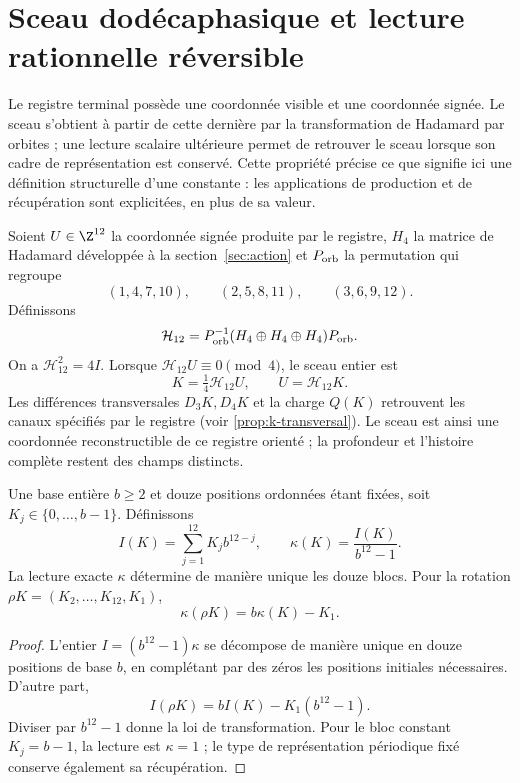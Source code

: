 \section{Sceau dodécaphasique et lecture rationnelle réversible}
\label{sec:sello}

Le registre terminal possède une coordonnée visible et une coordonnée
signée. Le sceau s'obtient à partir de cette dernière par la transformation
de Hadamard par orbites ; une lecture scalaire ultérieure permet de retrouver
le sceau lorsque son cadre de représentation est conservé. Cette propriété
précise ce que signifie ici une définition structurelle d'une constante :
les applications de production et de récupération sont explicitées, en plus de sa valeur.

Soient $U\in\Z^{12}$ la coordonnée signée produite par le registre,
$H_4$ la matrice de Hadamard développée à la section~\ref{sec:action}
et $P_{\rm orb}$ la permutation qui regroupe
\[
 (1,4,7,10),\qquad(2,5,8,11),\qquad(3,6,9,12).
\]
Définissons
\[
 \mathcal H_{12}=P_{\rm orb}^{-1}
 (H_4\oplus H_4\oplus H_4)P_{\rm orb}.
\]
On a $\mathcal H_{12}^2=4I$. Lorsque
$\mathcal H_{12}U\equiv0\pmod4$, le sceau entier est
\[
 K=\tfrac14\mathcal H_{12}U,
 \qquad U=\mathcal H_{12}K.
\]
Les différences transversales $D_3K,D_4K$ et la charge $Q(K)$ retrouvent
les canaux spécifiés par le registre (voir \ref{prop:k-transversal}).
Le sceau est ainsi une coordonnée reconstructible de ce registre orienté ;
la profondeur et l’histoire complète restent des champs distincts.

\begin{proposition}
Une base entière $b\ge2$ et douze positions ordonnées étant fixées, soit
$K_j\in\{0,\ldots,b-1\}$. Définissons
\[
 I(K)=\sum_{j=1}^{12}K_jb^{12-j},\qquad
 \kappa(K)=\frac{I(K)}{b^{12}-1}.
\]
La lecture exacte $\kappa$ détermine de manière unique les douze blocs.
Pour la rotation $\rho K=(K_2,\ldots,K_{12},K_1)$,
\[
 \boxed{\kappa(\rho K)=b\kappa(K)-K_1.}
\]
\end{proposition}
\begin{proof}
L'entier $I=(b^{12}-1)\kappa$ se décompose de manière unique en douze
positions de base $b$, en complétant par des zéros les positions initiales
nécessaires. D'autre part,
\[
 I(\rho K)=bI(K)-K_1(b^{12}-1).
\]
Diviser par $b^{12}-1$ donne la loi de transformation. Pour le bloc
constant $K_j=b-1$, la lecture est $\kappa=1$ ; le type de représentation
périodique fixé conserve également sa récupération.
\end{proof}

